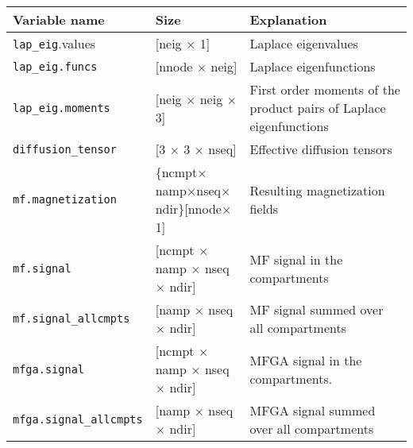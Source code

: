 \begin{tabular}{|l|l|p{5.4cm}|}
    \hline
    Variable name                 & Size                                                          & Explanation                                                        \\ \hline
    \verb+lap_eig+.values & [neig $\times$ 1]                                             & Laplace eigenvalues                                                \\ \hline
    \verb+lap_eig.funcs+        & [nnode $\times$ neig]                                         & Laplace eigenfunctions                                             \\ \hline
    \verb+lap_eig.moments+        & [neig $\times$ neig $\times$ 3]                               & First order moments of the product pairs of Laplace eigenfunctions \\ \hline
    \verb+diffusion_tensor+        & [3 $\times$ 3 $\times$ nseq]                                  & Effective diffusion tensors                                        \\ \hline
    \verb+mf.magnetization+        & \{ncmpt$\times$namp$\times$nseq$\times$ndir\}[nnode$\times$1] & Resulting magnetization fields                                     \\ \hline
    \verb+mf.signal+        & [ncmpt $\times$ namp $\times$ nseq $\times$ ndir]             & MF signal in the compartments                                      \\ \hline
    \verb+mf.signal_allcmpts+        & [namp $\times$ nseq $\times$ ndir]                            & MF signal summed over all compartments                             \\ \hline
    \verb+mfga.signal+        & [ncmpt $\times$ namp $\times$ nseq $\times$ ndir]             & MFGA signal in the compartments.                                   \\ \hline
    \verb+mfga.signal_allcmpts+        & [namp $\times$ nseq $\times$ ndir]                            & MFGA signal summed over all compartments                           \\ \hline
\end{tabular}
